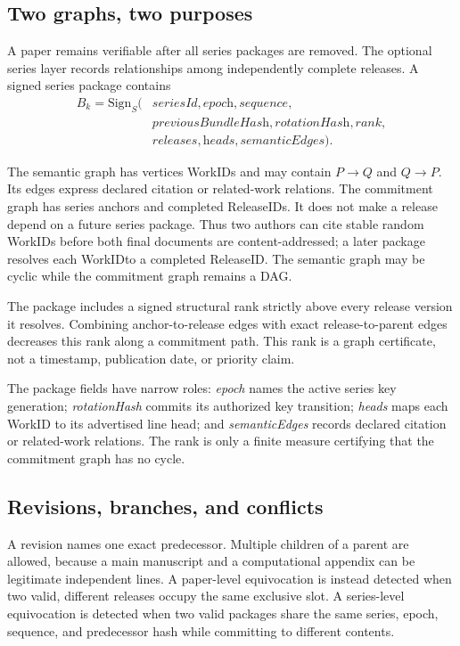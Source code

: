 \documentclass[conference,compsoc]{IEEEtran}
\newcommand{\workid}{\textsf{WorkID}}
\newcommand{\releaseid}{\textsf{ReleaseID}}
\begin{document}
\subsection{Two graphs, two purposes}

A paper remains verifiable after all series packages are removed. The optional series layer records relationships among independently complete releases. A signed series package contains
\[
\begin{aligned}
  B_k = \mathrm{Sign}_{S}(&\textit{seriesId},\textit{epoch},\textit{sequence},\\
                          &\textit{previousBundleHash},\textit{rotationHash},\textit{rank},\\
                          &\textit{releases},\textit{heads},\textit{semanticEdges}).
\end{aligned}
\]

The semantic graph has vertices \workid s and may contain $P \rightarrow Q$ and $Q \rightarrow P$. Its edges express declared citation or related-work relations. The commitment graph has series anchors and completed \releaseid s. It does not make a release depend on a future series package. Thus two authors can cite stable random \workid s before both final documents are content-addressed; a later package resolves each \workid to a completed \releaseid. The semantic graph may be cyclic while the commitment graph remains a DAG.

The package includes a signed structural rank strictly above every release version it resolves. Combining anchor-to-release edges with exact release-to-parent edges decreases this rank along a commitment path. This rank is a graph certificate, not a timestamp, publication date, or priority claim.

The package fields have narrow roles: \textit{epoch} names the active series
key generation; \textit{rotationHash} commits its authorized key transition;
\textit{heads} maps each WorkID to its advertised line head; and
\textit{semanticEdges} records declared citation or related-work relations.
The rank is only a finite measure certifying that the commitment graph has no
cycle.

\subsection{Revisions, branches, and conflicts}

A revision names one exact predecessor. Multiple children of a parent are allowed, because a main manuscript and a computational appendix can be legitimate independent lines. A paper-level equivocation is instead detected when two valid, different releases occupy the same exclusive slot. A series-level equivocation is detected when two valid packages share the same series, epoch, sequence, and predecessor hash while committing to different contents.
\end{document}
